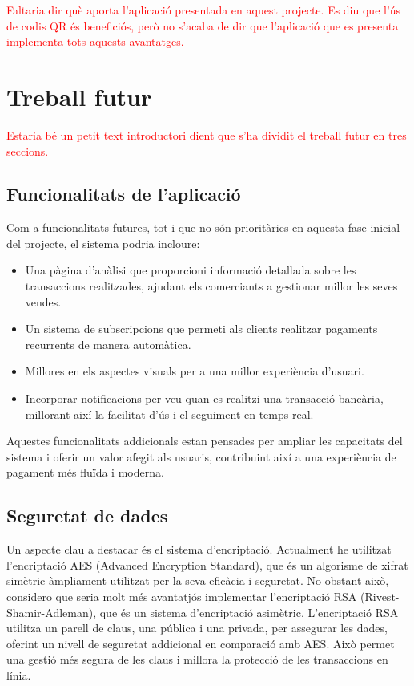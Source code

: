 \documentclass[a4paper,12pt,twoside]{ThesisStyle}
\newcommand{\pau}[1]{\textcolor{red}{#1}}
\begin{document}
\pau{Faltaria dir què aporta l'aplicació presentada en aquest projecte. Es diu que l'ús de codis QR és beneficiós, però no s'acaba de dir que l'aplicació que es presenta implementa tots aquests avantatges.}




\chapter{Treball futur}
\label{chp:treballfutur}

\pau{Estaria bé un petit text introductori dient que s'ha dividit el treball futur en tres seccions.}

\section{Funcionalitats de l'aplicació}
\label{sec: Funcionalitats de l'aplicació}

Com a funcionalitats futures, tot i que no són prioritàries en aquesta fase inicial del projecte, el sistema podria incloure:

\begin{itemize}
\item Una pàgina d'anàlisi que proporcioni informació detallada sobre les transaccions realitzades, ajudant els comerciants a gestionar millor les seves vendes.
\item Un sistema de subscripcions que permeti als clients realitzar pagaments recurrents de manera automàtica.
\item Millores en els aspectes visuals per a una millor experiència d'usuari.
\item Incorporar notificacions per veu quan es realitzi una transacció bancària, millorant així la facilitat d'ús i el seguiment en temps real.
\end{itemize}

Aquestes funcionalitats addicionals estan pensades per ampliar les capacitats del sistema i oferir un valor afegit als usuaris, contribuint així a una experiència de pagament més fluïda i moderna.

\section{Seguretat de dades}
\label{sec: Seguretat de dades}

Un aspecte clau a destacar és el sistema d'encriptació. Actualment he utilitzat l'encriptació AES (Advanced Encryption Standard), que és un algorisme de xifrat simètric àmpliament utilitzat per la seva eficàcia i seguretat. No obstant això, considero que seria molt més avantatjós implementar l'encriptació RSA (Rivest-Shamir-Adleman), que és un sistema d'encriptació asimètric. L'encriptació RSA utilitza un parell de claus, una pública i una privada, per assegurar les dades, oferint un nivell de seguretat addicional en comparació amb AES. Això permet una gestió més segura de les claus i millora la protecció de les transaccions en línia.
\end{document}
